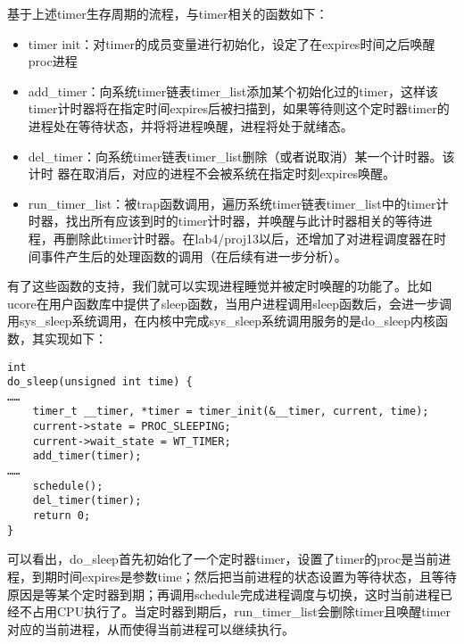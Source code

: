 基于上述timer生存周期的流程，与timer相关的函数如下：

\begin{itemize}
\item
  timer
  init：对timer的成员变量进行初始化，设定了在expires时间之后唤醒proc进程
\item
  add\_timer：向系统timer链表timer\_list添加某个初始化过的timer，这样该timer计时器将在指定时间expires后被扫描到，如果等待则这个定时器timer的进程处在等待状态，并将将进程唤醒，进程将处于就绪态。
\item
  del\_timer：向系统timer链表timer\_list删除（或者说取消）某一个计时器。该计时
  器在取消后，对应的进程不会被系统在指定时刻expires唤醒。
\item
  run\_timer\_list：被trap函数调用，遍历系统timer链表timer\_list中的timer计时器，找出所有应该到时的timer计时器，并唤醒与此计时器相关的等待进程，再删除此timer计时器。在lab4/proj13以后，还增加了对进程调度器在时间事件产生后的处理函数的调用（在后续有进一步分析）。
\end{itemize}

有了这些函数的支持，我们就可以实现进程睡觉并被定时唤醒的功能了。比如ucore在用户函数库中提供了sleep函数，当用户进程调用sleep函数后，会进一步调用sys\_sleep系统调用，在内核中完成sys\_sleep系统调用服务的是do\_sleep内核函数，其实现如下：

\begin{lstlisting}
int
do_sleep(unsigned int time) {
……
    timer_t __timer, *timer = timer_init(&__timer, current, time);
    current->state = PROC_SLEEPING;
    current->wait_state = WT_TIMER;
    add_timer(timer);
……
    schedule();
    del_timer(timer);
    return 0;
}
\end{lstlisting}

可以看出，do\_sleep首先初始化了一个定时器timer，设置了timer的proc是当前进程，到期时间expires是参数time；然后把当前进程的状态设置为等待状态，且等待原因是等某个定时器到期；再调用schedule完成进程调度与切换，这时当前进程已经不占用CPU执行了。当定时器到期后，run\_timer\_list会删除timer且唤醒timer对应的当前进程，从而使得当前进程可以继续执行。

